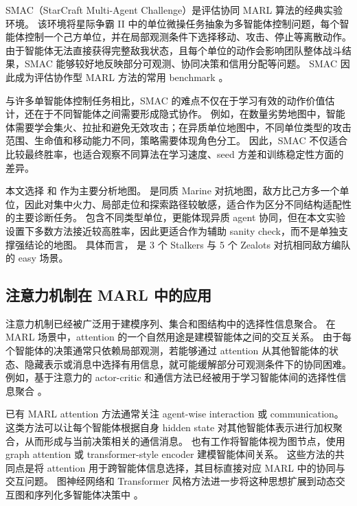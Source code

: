 SMAC（StarCraft Multi-Agent Challenge）是评估协同 MARL 算法的经典实验环境。
该环境将星际争霸 II 中的单位微操任务抽象为多智能体控制问题，每个智能体控制一个己方单位，并在局部观测条件下选择移动、攻击、停止等离散动作。
由于智能体无法直接获得完整敌我状态，且每个单位的动作会影响团队整体战斗结果，SMAC 能够较好地反映部分可观测、协同决策和信用分配等问题。
SMAC 因此成为评估协作型 MARL 方法的常用 benchmark \cite{samvelyan2019starcraft}。

与许多单智能体控制任务相比，SMAC 的难点不仅在于学习有效的动作价值估计，还在于不同智能体之间需要形成隐式协作。
例如，在数量劣势地图中，智能体需要学会集火、拉扯和避免无效攻击；在异质单位地图中，不同单位类型的攻击范围、生命值和移动能力不同，策略需要体现角色分工。
因此，SMAC 不仅适合比较最终胜率，也适合观察不同算法在学习速度、seed 方差和训练稳定性方面的差异。

本文选择  和  作为主要分析地图。
 是同质 Marine 对抗地图，敌方比己方多一个单位，因此对集中火力、局部走位和探索路径较敏感，适合作为区分不同结构适配性的主要诊断任务。
 包含不同类型单位，更能体现异质 agent 协同，但在本文实验设置下多数方法接近较高胜率，因此更适合作为辅助 sanity check，而不是单独支撑强结论的地图。
具体而言， 是 3 个 Stalkers 与 5 个 Zealots 对抗相同敌方编队的 easy 场景。

\subsection{注意力机制在 MARL 中的应用}

注意力机制已经被广泛用于建模序列、集合和图结构中的选择性信息聚合。
在 MARL 场景中，attention 的一个自然用途是建模智能体之间的交互关系。
由于每个智能体的决策通常只依赖局部观测，若能够通过 attention 从其他智能体的状态、隐藏表示或消息中选择有用信息，就可能缓解部分可观测条件下的协同困难。
例如，基于注意力的 actor-critic 和通信方法已经被用于学习智能体间的选择性信息聚合 \cite{iqbal2019actor,das2019tarmac}。

已有 MARL attention 方法通常关注 agent-wise interaction 或 communication。
这类方法可以让每个智能体根据自身 hidden state 对其他智能体表示进行加权聚合，从而形成与当前决策相关的通信消息。
也有工作将智能体视为图节点，使用 graph attention 或 transformer-style encoder 建模智能体间关系。
这些方法的共同点是将 attention 用于跨智能体信息选择，其目标直接对应 MARL 中的协同与交互问题。
图神经网络和 Transformer 风格方法进一步将这种思想扩展到动态交互图和序列化多智能体决策中 \cite{jiang2020graph,wen2022multiagenttransformer}。

